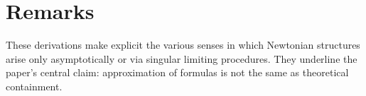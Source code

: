\documentclass[12pt]{article}
\begin{document}
\section*{Remarks}
These derivations make explicit the various senses in which Newtonian structures arise only asymptotically or via singular limiting procedures. They underline the paper's central claim: approximation of formulas is not the same as theoretical containment.
\end{document}
